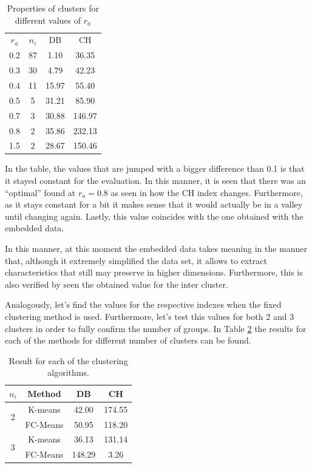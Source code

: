 \documentclass[conference]{IEEEtran}
\theoremstyle{definition}
\theoremstyle{remark}
\theoremstyle{remark}
\begin{document}
\begin{table}
  \centering
  \begin{tabular}{cccc}
    \hline
    $r_a$ & $n_i$ & DB    & CH     \\
    0.2   & 87    & 1.10  & 36.35  \\
    0.3   & 30    & 4.79  & 42.23  \\
    0.4   & 11    & 15.97 & 55.40  \\
    0.5   & 5     & 31.21 & 85.90  \\
    0.7   & 3     & 30.88 & 146.97 \\
    0.8   & 2     & 35.86 & 232.13 \\
    1.5   & 2     & 28.67 & 150.46 \\ \hline
  \end{tabular}
  \caption{Properties of clusters for different values of $r_{a}$}
  \label{tab:expds}
\end{table}

In the table, the values that are jumped with a bigger difference than 0.1 is
that it stayed constant for the evaluation. In this manner, it is seen that
there was an ``optimal'' found at $r_{a}=0.8$ as seen in how the CH index
changes. Furthermore, as it stays constant for a bit it makes sense that it
would actually be in a valley until changing again. Lastly, this value coincides
with the one obtained with the embedded data.

In this manner, at this moment the embedded data takes meaning in the manner
that, although it extremely simplified the data set, it allows to extract
characteristics that still may preserve in higher dimensions. Furthermore, this
is also verified by seen the obtained value for the inter cluster.

Analogously, let's find the values for the respective indexes when the fixed
clustering method is used. Furthermore, let's test this values for both 2 and 3
clusters in order to fully confirm the number of groups. In Table \ref{tab:clds}
the results for each of the methods for different number of clusters can be
found.

\begin{table}
  \centering
  \begin{tabular}{cccc}
    \hline
    \multicolumn{1}{l}{$n_i$} & Method   & DB     & CH     \\ \hline
    \multirow{2}{*}{2}        & K-means  & 42.00  & 174.55 \\
                              & FC-Means & 50.95  & 118.20 \\ \hline
    \multirow{2}{*}{3}        & K-means  & 36.13  & 131.14 \\
                              & FC-Means & 148.29 & 3.26   \\ \hline
  \end{tabular}
  \caption{Result for each of the clustering algorithms.}
\label{tab:clds}
\end{table}
\end{document}
